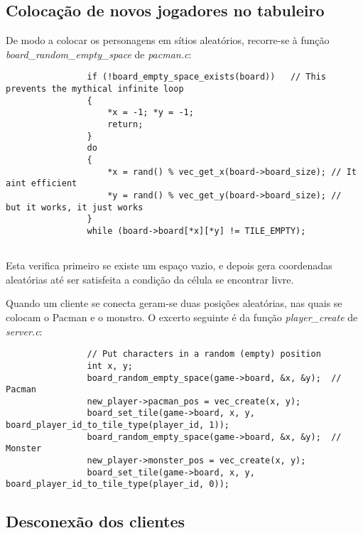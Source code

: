 \documentclass[a4paper]{report}
\begin{document}
        \subsection{Colocação de novos jogadores no tabuleiro}
        
            \par De modo a colocar os personagens em sítios aleatórios, recorre-se à função \textit{board\_random\_empty\_space} de \textit{pacman.c}:
            \begin{lstlisting}
                if (!board_empty_space_exists(board))   // This prevents the mythical infinite loop
                {
                    *x = -1; *y = -1;
                    return;
                }
                do
                {
                    *x = rand() % vec_get_x(board->board_size); // It aint efficient
                    *y = rand() % vec_get_y(board->board_size); //  but it works, it just works
                }
                while (board->board[*x][*y] != TILE_EMPTY);
            
            \end{lstlisting}
            \par Esta verifica primeiro se existe um espaço vazio, e depois gera coordenadas aleatórias até ser satisfeita a condição da célula se encontrar livre.
            \par Quando um cliente se conecta geram-se duas posições aleatórias, nas quais se colocam o Pacman e o monstro. O excerto seguinte é da função \textit{player\_create} de \textit{server.c}:
            \begin{lstlisting}
                // Put characters in a random (empty) position
                int x, y;
                board_random_empty_space(game->board, &x, &y);  // Pacman
                new_player->pacman_pos = vec_create(x, y);
                board_set_tile(game->board, x, y, board_player_id_to_tile_type(player_id, 1));
                board_random_empty_space(game->board, &x, &y);  // Monster
                new_player->monster_pos = vec_create(x, y);
                board_set_tile(game->board, x, y, board_player_id_to_tile_type(player_id, 0));
            \end{lstlisting}
            
        \subsection{Desconexão dos clientes}
            
\end{document}
